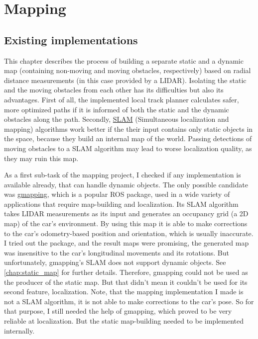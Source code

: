 \chapter{Mapping}
\label{chap:mapping}

\section{Existing implementations}
This chapter describes the process of building a separate static and a dynamic map (containing non-moving and moving obstacles, respectively) based on radial distance measurements (in this case provided by a LIDAR). Isolating the static and the moving obstacles from each other has its difficulties but also its advantages. First of all, the implemented local track planner calculates safer, more optimized paths if it is informed of both the static and the dynamic obstacles along the path. Secondly, \href{https://en.wikipedia.org/wiki/Simultaneous_localization_and_mapping}{SLAM} (Simultaneous localization and mapping) algorithms work better if the their input contains only static objects in the space, because they build an internal map of the world. Passing detections of moving obstacles to a SLAM algorithm may lead to worse localization quality, as they may ruin this map.

As a first sub-task of the mapping project, I checked if any implementation is available already, that can handle dynamic objects. The only possible candidate was \href{http://wiki.ros.org/gmapping}{gmapping}, which is a popular ROS package, used in a wide variety of applications that require map-building and localization. Its SLAM algorithm takes LIDAR measurements as its input and generates an occupancy grid (a 2D map) of the car's environment. By using this map it is able to make corrections to the car's odometry-based position and orientation, which is usually inaccurate. I tried out the package, and the result maps were promising, the generated map was insensitive to the car's longitudinal movements and its rotations. But unfortunately, gmapping's SLAM does not support dynamic objects. See \ref{chap:static_map} for further details. Therefore, gmapping could not be used as the producer of the static map. But that didn't mean it couldn't be used for its second feature, localization. Note, that the mapping implementation I made is not a SLAM algorithm, it is not able to make corrections to the car's pose. So for that purpose, I still needed the help of gmapping, which proved to be very reliable at localization. But the static map-building needed to be implemented internally.

